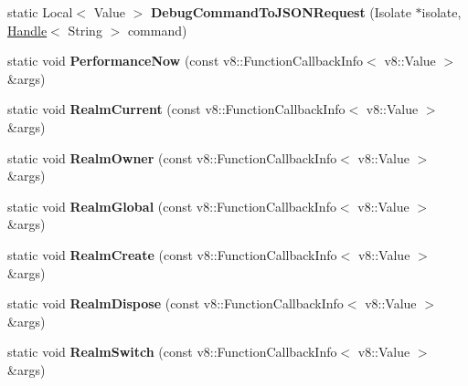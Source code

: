 \begin{DoxyCompactItemize}
\item 
\hypertarget{classv8_1_1_shell_ab3834fc2dbe510ca6792d321611d26f4}{}static Local$<$ Value $>$ {\bfseries Debug\+Command\+To\+J\+S\+O\+N\+Request} (Isolate $\ast$isolate, \hyperlink{classv8_1_1_handle}{Handle}$<$ String $>$ command)\label{classv8_1_1_shell_ab3834fc2dbe510ca6792d321611d26f4}

\item 
\hypertarget{classv8_1_1_shell_a20b4f5fb7215088193a8bcf94a622f83}{}static void {\bfseries Performance\+Now} (const v8\+::\+Function\+Callback\+Info$<$ v8\+::\+Value $>$ \&args)\label{classv8_1_1_shell_a20b4f5fb7215088193a8bcf94a622f83}

\item 
\hypertarget{classv8_1_1_shell_a9a9b12463634c52f521809404acfe972}{}static void {\bfseries Realm\+Current} (const v8\+::\+Function\+Callback\+Info$<$ v8\+::\+Value $>$ \&args)\label{classv8_1_1_shell_a9a9b12463634c52f521809404acfe972}

\item 
\hypertarget{classv8_1_1_shell_a9b3772fd4ecaac0b3586e66e9c18bcde}{}static void {\bfseries Realm\+Owner} (const v8\+::\+Function\+Callback\+Info$<$ v8\+::\+Value $>$ \&args)\label{classv8_1_1_shell_a9b3772fd4ecaac0b3586e66e9c18bcde}

\item 
\hypertarget{classv8_1_1_shell_acee30321581bbf1c878a31ca8c54d546}{}static void {\bfseries Realm\+Global} (const v8\+::\+Function\+Callback\+Info$<$ v8\+::\+Value $>$ \&args)\label{classv8_1_1_shell_acee30321581bbf1c878a31ca8c54d546}

\item 
\hypertarget{classv8_1_1_shell_a321307d1e9e6a587bbf3091195346f46}{}static void {\bfseries Realm\+Create} (const v8\+::\+Function\+Callback\+Info$<$ v8\+::\+Value $>$ \&args)\label{classv8_1_1_shell_a321307d1e9e6a587bbf3091195346f46}

\item 
\hypertarget{classv8_1_1_shell_a8bb9ca4c151b7ed3e6bdd64d3f814a65}{}static void {\bfseries Realm\+Dispose} (const v8\+::\+Function\+Callback\+Info$<$ v8\+::\+Value $>$ \&args)\label{classv8_1_1_shell_a8bb9ca4c151b7ed3e6bdd64d3f814a65}

\item 
\hypertarget{classv8_1_1_shell_ab4b04a517ba41c1843ae1db5f03ee48b}{}static void {\bfseries Realm\+Switch} (const v8\+::\+Function\+Callback\+Info$<$ v8\+::\+Value $>$ \&args)\label{classv8_1_1_shell_ab4b04a517ba41c1843ae1db5f03ee48b}


\end{DoxyCompactItemize}
